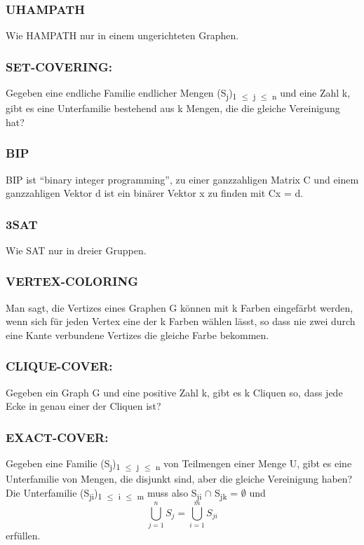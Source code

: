 \documentclass[11pt,twoside,landscape]{article}
\begin{document}
\begin{multicols}{3}
\subsubsection*{UHAMPATH}
\label{sec:orgeb150c5}
Wie HAMPATH nur in einem ungerichteten Graphen. 
\subsubsection*{SET-COVERING:}
\label{sec:org2d91974}
Gegeben eine endliche Familie endlicher Mengen (S\textsubscript{j})\textsubscript{1 \(\le\) j \(\le\) n} und eine Zahl k, gibt es eine Unterfamilie bestehend aus k Mengen, die die gleiche Vereinigung hat?

\subsubsection*{BIP}
\label{sec:org6fb2b63}
BIP ist “binary integer programming”, zu einer ganzzahligen Matrix C und einem ganzzahligen Vektor d ist ein binärer Vektor x zu finden mit Cx = d.
\subsubsection*{3SAT}
\label{sec:orgf139a6d}
Wie SAT nur in dreier Gruppen.
\subsubsection*{VERTEX-COLORING}
\label{sec:org97337c2}
Man sagt, die Vertizes eines Graphen G können mit k Farben eingefärbt werden, wenn sich für jeden Vertex eine der k Farben wählen lässt, so dass nie zwei durch eine Kante verbundene Vertizes die gleiche Farbe bekommen.
\subsubsection*{CLIQUE-COVER:}
\label{sec:org8809c04}
Gegeben ein Graph G und eine positive Zahl k, gibt es k Cliquen so, dass jede Ecke in genau einer der Cliquen ist?

\subsubsection*{EXACT-COVER:}
\label{sec:org78a7167}
Gegeben eine Familie (S\textsubscript{j})\textsubscript{1 \(\le\) j \(\le\) n} von Teilmengen einer Menge U, gibt es eine Unterfamilie von Mengen, die disjunkt sind, aber die gleiche Vereinigung haben? Die Unterfamilie (S\textsubscript{ji})\textsubscript{1 \(\le\) i \(\le\) m} muss also S\textsubscript{ji} \(\cap\) S\textsubscript{jk} = \(\emptyset\) und
$$
\bigcup^n_{j=1} S_j = \bigcup^m_{i=1} S_{ji}
$$
erfüllen.


\end{multicols}
\end{document}
